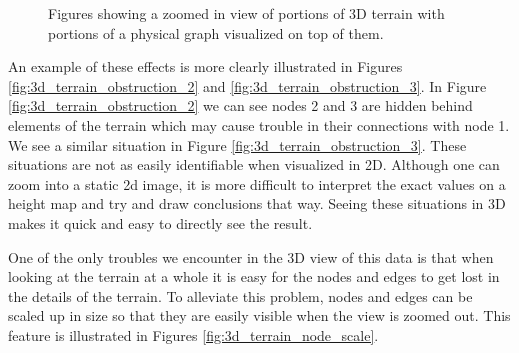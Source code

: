 \begin{figure}[ht]
{	\label{fig:3d_terrain_obstruction_2}
}
  \caption{Figures showing a zoomed in view of portions of 3D terrain with portions of a physical graph visualized on top of them.}
\label{fig:3d_terrain_closeups}
\end{figure}

An example of these effects is more clearly illustrated in Figures \ref{fig:3d_terrain_obstruction_2} and \ref{fig:3d_terrain_obstruction_3}.  In Figure \ref{fig:3d_terrain_obstruction_2} we can see nodes 2 and 3 are hidden behind elements of the terrain which may cause trouble in their connections with node 1.  We see a similar situation in Figure \ref{fig:3d_terrain_obstruction_3}.  These situations are not as easily identifiable when visualized in 2D.  Although one can zoom into a static 2d image, it is more difficult to interpret the exact values on a height map and try and draw conclusions that way.  Seeing these situations in 3D makes it quick and easy to directly see the result.

One of the only troubles we encounter in the 3D view of this data is that when looking at the terrain at a whole it is easy for the nodes and edges to get lost in the details of the terrain.  To alleviate this problem, nodes and edges can be scaled up in size so that they are easily visible when the view is zoomed out.  This feature is illustrated in Figures \ref{fig:3d_terrain_node_scale}.

